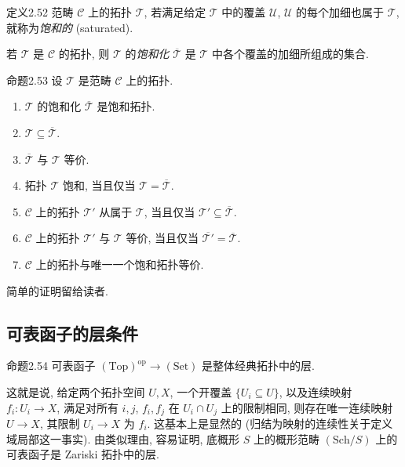 \begin{origstatement}{定义}{2.52}\label{ch02:def252}
范畴 $\mathcal C$ 上的拓扑 $\mathcal T$, 若满足给定 $\mathcal T$ 中的覆盖 $\mathcal U$, $\mathcal U$ 的每个加细也属于 $\mathcal T$, 就称为\emph{饱和的} (saturated).

若 $\mathcal T$ 是 $\mathcal C$ 的拓扑, 则 $\mathcal T$ 的\emph{饱和化} $\overline{\mathcal T}$ 是 $\mathcal T$ 中各个覆盖的加细所组成的集合.
\end{origstatement}

\begin{origstatement}{命题}{2.53}\label{ch02:prop253}
设 $\mathcal T$ 是范畴 $\mathcal C$ 上的拓扑.
\begin{enumerate}
\item[(i)] $\mathcal T$ 的饱和化 $\overline{\mathcal T}$ 是饱和拓扑.
\item[(ii)] $\mathcal T\subseteq\overline{\mathcal T}$.
\item[(iii)] $\overline{\mathcal T}$ 与 $\mathcal T$ 等价.
\item[(iv)] 拓扑 $\mathcal T$ 饱和, 当且仅当 $\mathcal T=\overline{\mathcal T}$.
\item[(v)] $\mathcal C$ 上的拓扑 $\mathcal T'$ 从属于 $\mathcal T$, 当且仅当 $\mathcal T'\subseteq\overline{\mathcal T}$.
\item[(vi)] $\mathcal C$ 上的拓扑 $\mathcal T'$ 与 $\mathcal T$ 等价, 当且仅当 $\overline{\mathcal T'}=\overline{\mathcal T}$.
\item[(vii)] $\mathcal C$ 上的拓扑与唯一一个饱和拓扑等价.
\end{enumerate}
\end{origstatement}

简单的证明留给读者.

\subsection{可表函子的层条件}\label{ch02:sec236}
\begin{origstatement}{命题}{2.54}\label{ch02:prop254}
可表函子 $(\mathrm{Top})^{\mathrm{op}}\to(\mathrm{Set})$ 是整体经典拓扑中的层.
\end{origstatement}

这就是说, 给定两个拓扑空间 $U,X$, 一个开覆盖 $\{U_i\subseteq U\}$, 以及连续映射 $f_i:U_i\to X$, 满足对所有 $i,j$, $f_i,f_j$ 在 $U_i\cap U_j$ 上的限制相同, 则存在唯一连续映射 $U\to X$, 其限制 $U_i\to X$ 为 $f_i$. 这基本上是显然的 (归结为映射的连续性关于定义域局部这一事实). 由类似理由, 容易证明, 底概形 $S$ 上的概形范畴 $(\mathrm{Sch}/S)$ 上的可表函子是 Zariski 拓扑中的层.

